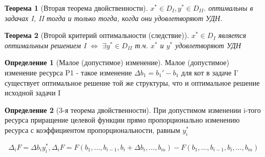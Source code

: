 \documentclass[a4paper]{article}
\newtheorem{theorem}{Теорема}[section]
\theoremstyle{definition}
\newtheorem*{definition}{Определение}
\theoremstyle{remark}
\begin{document}
\begin{theorem}[Вторая теорема двойственности]
	$x^* \in D_I, y^*\in D_{II}.$ оптимальны в задачах I, II тогда и только тогда, когда они удовлетворяют УДН.
\end{theorem}
\begin{theorem}[Второй критерий оптимальности (следствие)]
	\(x^* \in D_I\) является оптимальным решением I \(\Leftrightarrow\)
	\(\exists y^* \in D_{II}\) т.ч. \(x^*\) и \(y^*\) удовлетворяют УДН
\end{theorem}
\begin{definition}[Малое (допустимое) изменение]
	Малое (допустимое) изменение ресурса P1 - такое изменение $\Delta b_1 = b_1' - b_1$ для кот в задаче I' существует оптимальное решение той же структуры, что и оптимальное решение исходной задачи I
\end{definition}
\begin{definition}[3-я теорема двойственности]
	При допустимом изменении i-того ресурса приращение целевой функции прямо пропорционально изменению ресурса с коэффициентом пропорциональности, равным $y_i^*$

	$$\Delta_i F = \Delta b_i y_i^*, \Delta_i F = F(b_1, \dots, b_{i-1}, b_i + \Delta b_i, \dots, b_m)-F(b_1, \dots, b_{i-1}, b_i, \dots, b_m)$$
\end{definition}
\end{document}
